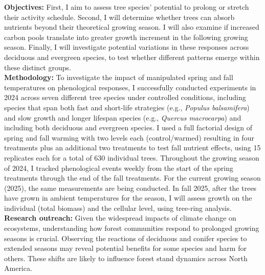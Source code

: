 \documentclass[12pt]{article}
\begin{document}
\textbf {Objectives:} First, I aim to assess tree species' potential to prolong or stretch their activity schedule. Second, I will determine whether trees can absorb nutrients beyond their theoretical growing season. I will also examine if increased carbon pools translate into greater growth increment in the following growing season. Finally, I will investigate potential variations in these responses across deciduous and evergreen species, to test whether different patterns emerge within these distinct groups.\\ %
\textbf {Methodology:} To investigate the impact of manipulated spring and fall temperatures on phenological responses, I successfully conducted experiments in 2024 across seven different tree species under controlled conditions, including species that span both fast and short-life strategies (e.g., \emph{Populus balsamifera}) and slow growth and longer lifespan species (e.g., \emph{Quercus macrocarpa}) and including both deciduous and evergreen species.\citep{jonsson_annual_2010} I used a full factorial design of spring and fall warming with two levels each (control/warmed) resulting in four treatments plus an additional two treatments to test fall nutrient effects, using 15 replicates each for a total of 630 individual trees. %
Throughout the growing season of 2024, I tracked phenological events weekly from the start of the spring treatments through the end of the fall treatments. For the current growing season (2025), the same measurements are being conducted. In fall 2025, after the trees have grown in ambient temperatures for the season, I will assess growth on the individual (total biomass) and the cellular level, using tree-ring analysis.\\
\textbf{Research outreach:} Given the widespread impacts of climate change on ecosystems, understanding how forest communities respond to prolonged growing seasons is crucial. Observing the reactions of deciduous and conifer species to extended seasons may reveal potential benefits for some species and harm for others. These shifts are likely to influence forest stand dynamics across North America.


\end{document}
